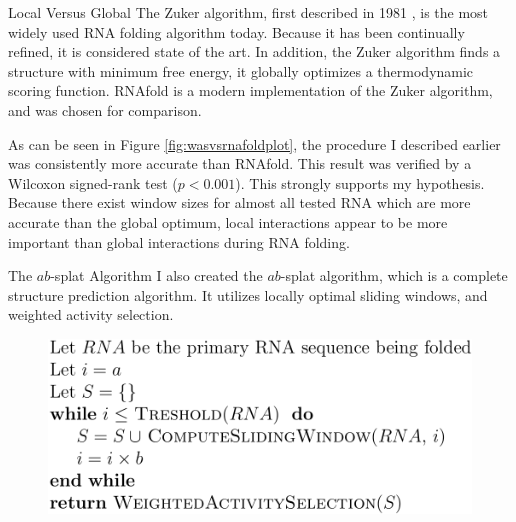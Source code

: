 \documentclass[final]{beamer}
\newlength{\onecolwid}
\begin{document}
\begin{frame}[t]
\begin{columns}[t]
\begin{column}{\onecolwid}
\begin{block}{Local Versus Global}
The Zuker algorithm, first described in 1981 \cite{zuker1981}, is the most widely used RNA folding algorithm today. Because it has been continually refined, it is considered state of the art. In addition, the Zuker algorithm finds a structure with minimum free energy, it globally optimizes a thermodynamic scoring function. RNAfold \cite{vienna} is a modern implementation of the Zuker algorithm, and was chosen for comparison.


As can be seen in Figure \ref{fig:wasvsrnafoldplot}, the procedure I described earlier was consistently more accurate than RNAfold. This result was verified by a Wilcoxon signed-rank test ($p < 0.001$). This strongly supports my hypothesis. Because there exist window sizes for almost all tested RNA which are more accurate than the global optimum, local interactions appear to be more important than global interactions during RNA folding.
            
         
          \end{block}
    
     \begin{block}{The $ab$-splat Algorithm}
I also created the $ab$-splat algorithm, which is a complete structure prediction algorithm. It utilizes locally optimal sliding windows, and weighted activity selection.
\vspace{0.25in}
        \begin{figure}
          \begin{center}
            \includegraphics[width=10in]{pseudo.png} \\
            \label{fig:psuedocode}
          \end{center}
        \end{figure}        


          \end{block} 
          
          
          

\end{column}
\end{columns}
\end{frame}
\end{document}
